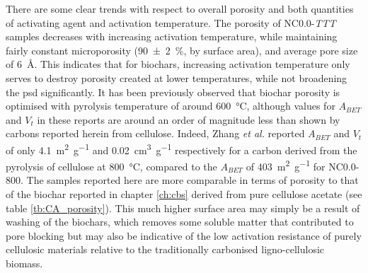There are some clear trends with respect to overall porosity and both quantities of activating agent and activation temperature. The porosity of NC0.0-\textit{TTT} samples decreases with increasing activation temperature, while maintaining fairly constant microporosity (\qty{90(2)}{\percent}, by surface area), and average pore size of \qty{6}{\angstrom}. This indicates that for \glspl{biochar}, increasing activation temperature only serves to destroy porosity created at lower temperatures, while not broadening the \acrshort{psd} significantly. It has been previously observed that \gls{biochar} porosity is optimised with \gls{pyrolysis} temperature of around \qty{600}{\degreeCelsius},\citep{zama2017role, ronsse2013production, leng2021overview} although values for $A_{BET}$ and $V_t$ in these reports are around an order of magnitude less than shown by carbons reported herein from cellulose. Indeed, Zhang \textit{et al.} reported $A_{BET}$ and $V_t$ of only \qty{4.1}{\metre\squared\per\gram} and \qty{0.02}{\cm\cubed\per\gram} respectively for a carbon derived from the pyrolysis of cellulose at \qty{800}{\degreeCelsius},\citep{zhang2021pyrolysis} compared to the $A_{BET}$ of \qty{403}{\metre\squared\per\gram} for NC0.0-800. The samples reported here are more comparable in terms of porosity to that of the \gls{biochar} reported in chapter \ref{ch:cbs} derived from pure cellulose acetate (see table \ref{tb:CA_porosity}). This much higher surface area may simply be a result of washing of the biochars, which removes some soluble matter that contributed to pore blocking but may also be indicative of the low activation resistance of purely cellulosic materials relative to the traditionally carbonised ligno-cellulosic biomass.\citep{Hirst2018simple, Balahmar2019Pre, Zhang2019situ, Deng2016Effects} 

